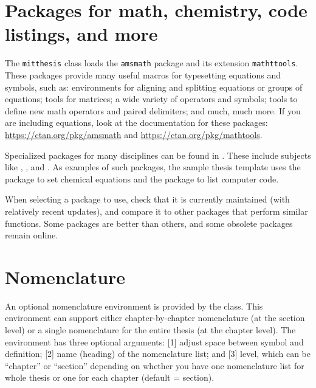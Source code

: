 \documentclass[11pt]{article}
\begin{document}
\section*{Packages for math, chemistry, code listings, and more}
The \texttt{mitthesis} class loads the \texttt{amsmath} package and its extension \texttt{mathttools}. These packages provide many useful macros for typesetting equations and symbols, such as: environments for aligning and splitting equations or groups of equations; tools for matrices; a wide variety of operators and symbols; tools to define new math operators and paired delimiters; and much, much more. If you are including equations, look at the documentation for these packages: \url{https://ctan.org/pkg/amsmath} and \url{https://ctan.org/pkg/mathtools}.

Specialized packages for many disciplines can be found in .  These include subjects like , , and .  As examples of such packages, the sample thesis template uses the package \texttt{} to set chemical equations and the package \texttt{} to list computer code.

When selecting a package to use, check that it is currently maintained (with relatively recent updates), and compare it to other packages that perform similar functions.  Some packages are better than others, and some obsolete packages remain online.

\section*{Nomenclature}
An optional nomenclature environment is provided by the class.  This environment can support either chapter-by-chapter nomenclature (at the section level) or a single nomenclature for the entire thesis (at the chapter level). The environment has three optional arguments: [1] adjust space between symbol and definition; [2] name (heading) of the nomenclature list; and [3] level, which can be ``chapter'' or ``section'' depending on whether you
have one nomenclature list for whole thesis or one for each chapter (default = section). 
\end{document}
